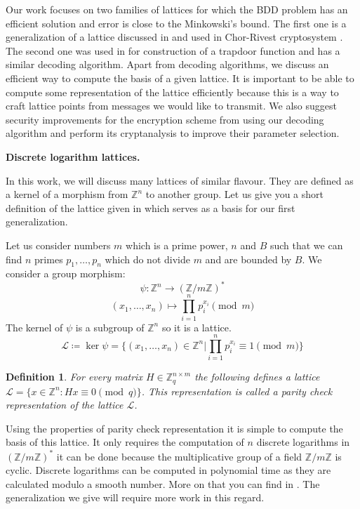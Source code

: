 \documentclass[12pt]{article}
\newcommand{\ZZ}{\mathbb{Z}}
\newcommand{\LL}{\mathcal{L}}
\newtheorem{definition}{Definition}
\begin{document}
Our work focuses on two families of lattices for which the BDD problem has an efficient solution and error is close to the Minkowski's bound. The first one is a generalization of a lattice discussed in \cite{[DP19]} and used in Chor-Rivest cryptosystem \cite{[CR88]}. The second one was used in \cite{[LLXY17]} for construction of a trapdoor function and has a similar decoding algorithm. Apart from decoding algorithms, we discuss an efficient way to compute the basis of a given lattice. It is important to be able to compute some representation of the lattice efficiently because this is a way to craft lattice points from messages we would like to transmit. We also suggest security improvements for the encryption scheme from \cite{[LLXY17]} using our decoding algorithm and perform its cryptanalysis to improve their parameter selection.

\textbf{Discrete logarithm lattices.}

In this work, we will discuss many lattices of similar flavour. They are defined as a kernel of a morphism from $\ZZ^{n}$ to another group. Let us give you a short definition of the lattice given in \cite{[DP19]} which serves as a basis for our first generalization.

Let us consider numbers $m$ which is a prime power, $n$ and $B$ such that we can find $n$ primes $p_{1}, \dots , p_{n}$ which do not divide $m$ and are bounded by $B$. We consider a group morphism:
\[
    \psi : \ZZ^{n} \rightarrow (\ZZ/m\ZZ)^*
\]
\[
    (x_{1}, \dots, x_{n}) \mapsto \prod_{i=1}^{n}p_{i}^{x_{i}} \pmod{m}
\]
The kernel of $\psi$ is a subgroup of $\ZZ^{n}$ so it is a lattice.
\[
    \LL \coloneqq \ker \psi = \{(x_{1}, \dots, x_{n}) \in \ZZ^{n} | \prod_{i=1}^{n}p_{i}^{x_{i}} \equiv 1 \pmod{m}\}
\]

\begin{definition}
For every matrix $H \in \ZZ_{q}^{n \times m}$ the following defines a lattice $\LL = \{x \in \ZZ^{n}: Hx \equiv 0 \pmod{q}\}$. This representation is called a parity check representation of the lattice $\LL$.
\end{definition}

Using the properties of parity check representation it is simple to compute the basis of this lattice. It only requires the computation of $n$ discrete logarithms in $(\ZZ/m\ZZ)^*$ it can be done because the multiplicative group of a field $\ZZ/m\ZZ$ is cyclic. Discrete logarithms can be computed in polynomial time as they are calculated modulo a smooth number. More on that you can find in \cite{[DP19]}. The generalization we give will require more work in this regard.
\end{document}

